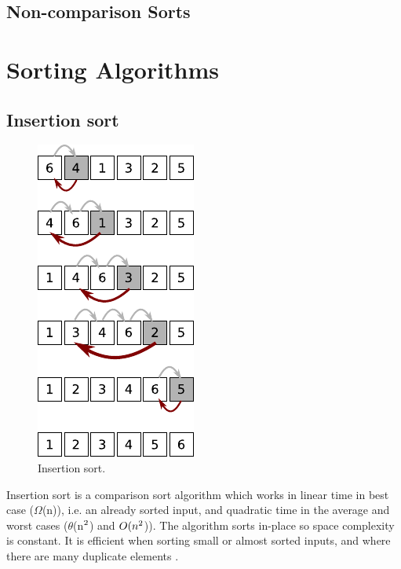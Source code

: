 \documentclass[12pt, a4paper]{article}
\begin{document}
\subsection{Non-comparison Sorts}

\section{Sorting Algorithms}


\subsection{Insertion sort}


\begin{figure}
    \centering
    \includegraphics{insertion_sort.pdf}
    \caption{\label{fig:insertion_sort}Insertion sort.}
\end{figure}

Insertion sort is a comparison sort algorithm which works in linear time in best case ($\Omega$(n)), i.e. an already sorted input, and quadratic time in the average and worst cases ($\theta$(n$\textsuperscript{2}$) and $O(n\textsuperscript{2}$)). The algorithm sorts in-place so space complexity is constant. It is efficient when sorting small or almost sorted inputs, and where there are many duplicate elements \autocite[p. 60]{heineman2016algorithms}.
\end{document}
